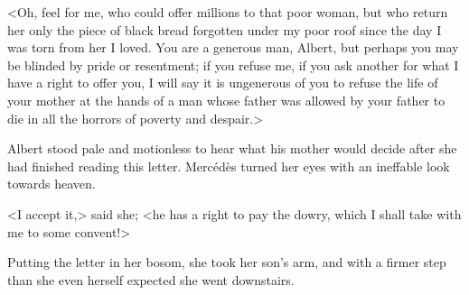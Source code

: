  <Oh, feel for me, who could offer millions to that poor woman, but who return her only the piece of black bread forgotten under my poor roof since the day I was torn from her I loved. You are a generous man, Albert, but perhaps you may be blinded by pride or resentment; if you refuse me, if you ask another for what I have a right to offer you, I will say it is ungenerous of you to refuse the life of your mother at the hands of a man whose father was allowed by your father to die in all the horrors of poverty and despair.> 

 Albert stood pale and motionless to hear what his mother would decide after she had finished reading this letter. Mercédès turned her eyes with an ineffable look towards heaven. 

 <I accept it,> said she; <he has a right to pay the dowry, which I shall take with me to some convent!> 

 Putting the letter in her bosom, she took her son's arm, and with a firmer step than she even herself expected she went downstairs. 